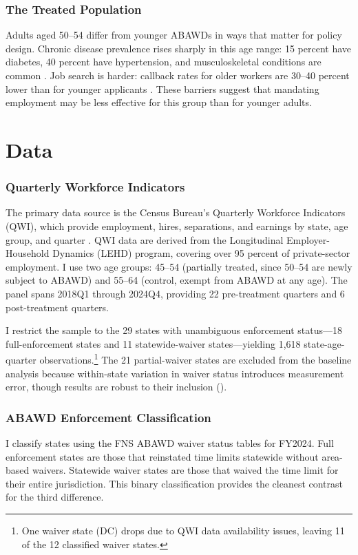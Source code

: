 \documentclass[12pt]{article}
\begin{document}
\subsubsection*{The Treated Population} Adults aged 50--54 differ from younger ABAWDs in ways that matter for policy design. Chronic disease prevalence rises sharply in this age range: 15 percent have diabetes, 40 percent have hypertension, and musculoskeletal conditions are common \citep{cdc2022chronic}. Job search is harder: callback rates for older workers are 30--40 percent lower than for younger applicants \citep{neumark2019age}. These barriers suggest that mandating employment may be less effective for this group than for younger adults.


\section{Data}
\label{sec:data}

\subsubsection*{Quarterly Workforce Indicators} The primary data source is the Census Bureau's Quarterly Workforce Indicators (QWI), which provide employment, hires, separations, and earnings by state, age group, and quarter \citep{census2024qwi}. QWI data are derived from the Longitudinal Employer-Household Dynamics (LEHD) program, covering over 95 percent of private-sector employment. I use two age groups: 45--54 (partially treated, since 50--54 are newly subject to ABAWD) and 55--64 (control, exempt from ABAWD at any age). The panel spans 2018Q1 through 2024Q4, providing 22 pre-treatment quarters and 6 post-treatment quarters.

I restrict the sample to the 29 states with unambiguous enforcement status---18 full-enforcement states and 11 statewide-waiver states---yielding 1,618 state-age-quarter observations.\footnote{One waiver state (DC) drops due to QWI data availability issues, leaving 11 of the 12 classified waiver states.} The 21 partial-waiver states are excluded from the baseline analysis because within-state variation in waiver status introduces measurement error, though results are robust to their inclusion ().

\subsubsection*{ABAWD Enforcement Classification} I classify states using the FNS ABAWD waiver status tables for FY2024. Full enforcement states are those that reinstated time limits statewide without area-based waivers. Statewide waiver states are those that waived the time limit for their entire jurisdiction. This binary classification provides the cleanest contrast for the third difference.
\end{document}
